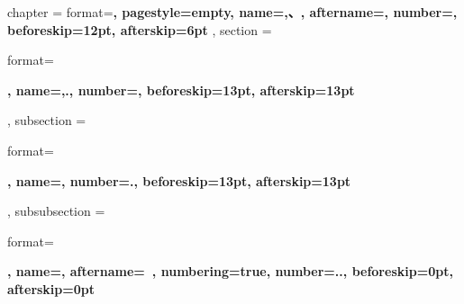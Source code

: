 \ctexset
{
    chapter =
    {
        format=\centering{}\bfseries,
        pagestyle=empty,
        name={,、},
        aftername=,
        number=,
        beforeskip=12pt,
        afterskip=6pt
    },
    section =
    {
        format=\raggedright{}\bfseries,
        name={,.},
        number=,
        beforeskip=13pt,
        afterskip=13pt
    },
    subsection =
    {
        format=\raggedright{}\bfseries,
        name={},
        number=.,
        beforeskip=13pt,
        afterskip=13pt
    },
    subsubsection =
    {
        format=\raggedright{}\bfseries,
        name={},
        aftername=~,
        numbering=true,
        number=..,
        beforeskip=0pt,
        afterskip=0pt
    }
}
